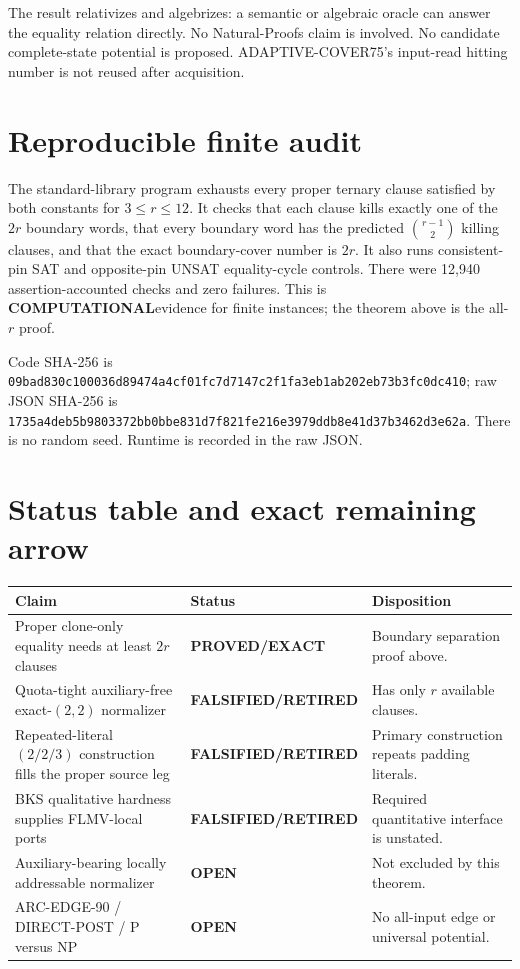 \documentclass[11pt]{article}
\newcommand{\EXACT}{\textbf{PROVED/EXACT}}
\newcommand{\COMP}{\textbf{COMPUTATIONAL}}
\newcommand{\OPEN}{\textbf{OPEN}}
\newcommand{\RET}{\textbf{FALSIFIED/RETIRED}}
\begin{document}
The result relativizes and algebrizes: a semantic or algebraic oracle can
answer the equality relation directly.  No Natural-Proofs claim is involved.
No candidate complete-state potential is proposed.  ADAPTIVE-COVER75's
input-read hitting number is not reused after acquisition.

\section{Reproducible finite audit}

The standard-library program
exhausts every proper ternary clause satisfied by both constants for
$3\le r\le12$.  It checks that each clause kills exactly one of the $2r$
boundary words, that every boundary word has the predicted
$\binom{r-1}{2}$ killing clauses, and that the exact boundary-cover number is
$2r$.  It also runs consistent-pin SAT and opposite-pin UNSAT equality-cycle
controls.  There were 12,940 assertion-accounted checks and zero failures.
This is \COMP evidence for finite instances; the theorem above is the
all-$r$ proof.

Code SHA-256 is
\texttt{09bad830c100036d89474a4cf01fc7d7147c2f1fa3eb1ab202eb73b3fc0dc410};
raw JSON SHA-256 is
\texttt{1735a4deb5b9803372bb0bbe831d7f821fe216e3979ddb8e41d37b3462d3e62a}.
There is no random seed.  Runtime is recorded in the raw JSON.

\section{Status table and exact remaining arrow}

\begin{center}
\begin{tabular}{p{.39\linewidth}p{.19\linewidth}p{.34\linewidth}}
\toprule
Claim & Status & Disposition\\
\midrule
Proper clone-only equality needs at least $2r$ clauses & \EXACT & Boundary separation proof above.\\
Quota-tight auxiliary-free exact-$(2,2)$ normalizer & \RET & Has only $r$ available clauses.\\
Repeated-literal $(2/2/3)$ construction fills the proper source leg & \RET & Primary construction repeats padding literals.\\
BKS qualitative hardness supplies FLMV-local ports & \RET & Required quantitative interface is unstated.\\
Auxiliary-bearing locally addressable normalizer & \OPEN & Not excluded by this theorem.\\
ARC-EDGE-90 / DIRECT-POST / P versus NP & \OPEN & No all-input edge or universal potential.\\
\bottomrule
\end{tabular}
\end{center}
\end{document}
